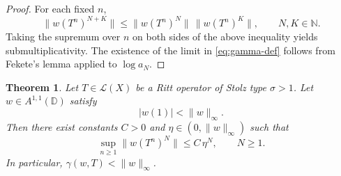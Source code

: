 \documentclass[11pt]{amsart}
\numberwithin{equation}{section}
\newtheorem{theorem}{Theorem}[section]
\theoremstyle{definition}
\theoremstyle{plain}
\def\L{L}
\def\D{\mathbb{D}}
\renewcommand{\L}{\mathcal L}
\begin{document}
\begin{proof}
For each fixed $n$,
\[
  \|w(T^n)^{N+K}\|\le \|w(T^n)^N\|\,\|w(T^n)^K\|, \qquad N, K \in \mathbb N.
\]
Taking the supremum over $n$ on both sides of the above inequality yields submultiplicativity.
The existence of the limit in \eqref{eq:gamma-def} follows from Fekete's lemma
applied to $\log a_N$. %
\end{proof}

\begin{theorem}\label{thm:HS-disc-necessity-A11}
Let $T\in\L(X)$ be a Ritt operator of Stolz type $\sigma>1$.
Let $w
\in A^{1,1}(\D)$ satisfy 
\begin{equation}\label{eq:w1-strict}
   |w(1)|<\|w\|_\infty.
\end{equation}
Then there exist constants $C>0$ and $\eta\in(0,\|w\|_\infty)$ such that
\begin{equation}\label{eq:KB-exp-decay-A11}
   \sup_{n\ge1}\|w(T^n)^N\|\le C\,\eta^N,
   \qquad N\ge1.
\end{equation}
In particular, $\gamma(w,T)<\|w\|_\infty$.
\end{theorem}
\end{document}
